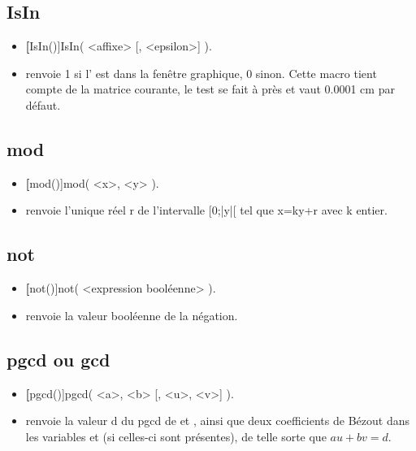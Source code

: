 \subsection{IsIn}

\begin{itemize}
 \item \util \textbf[IsIn()]{IsIn( <affixe> [, <epsilon>] )}.
 \item \desc renvoie 1 si l' est dans la fenêtre graphique, 0 sinon. Cette macro tient compte de la matrice courante, le test se fait à  près et  vaut 0.0001 cm par défaut.
\end{itemize}

\subsection{mod}

\begin{itemize}
 \item \util \textbf[mod()]{mod( <x>, <y> )}.
 \item \desc renvoie l'unique réel r de l'intervalle [0;|y|[ tel que x=ky+r avec k entier.
\end{itemize}

\subsection{not}\label{macnot}

\begin{itemize}
 \item \util \textbf[not()]{not( <expression booléenne> )}.
 \item \desc renvoie la valeur booléenne de la négation.
\end{itemize}

\subsection{pgcd ou gcd}

\begin{itemize}
 \item \util \textbf[pgcd()]{pgcd( <a>, <b> [, <u>, <v>] )}.
 \item \desc renvoie la valeur d du pgcd de  et , ainsi que deux coefficients de Bézout dans les variables  et  (si celles-ci sont présentes), de telle sorte que $au+bv=d$.
\end{itemize}

